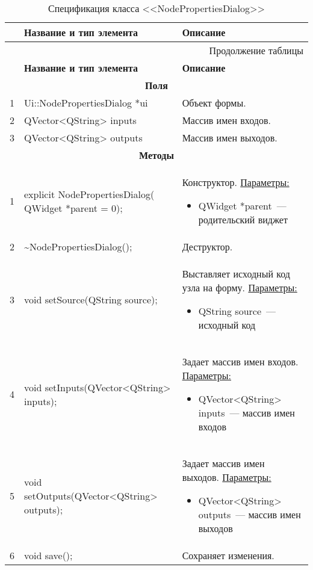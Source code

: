 \small
\singlespacing
\begin{longtable}[h]{|p{}|p{}|p{}|}
  \caption{Спецификация класса <<NodePropertiesDialog>>}
	\\ \hline
	  \textbf{\No}                  &
	  \textbf{Название и тип элемента}  &
	  \textbf{Описание}
	\\ \hline
  \endfirsthead

  \multicolumn{3}{r}{Продолжение таблицы \thetable{}}
  \\ \hline
	  \textbf{\No}                  &
	  \textbf{Название и тип элемента}  &
	  \textbf{Описание}
	\\ \hline
  \endhead

  \multicolumn{3}{|c|}{\textbf{Поля}} \\
  \hline
  1 & Ui::NodePropertiesDialog *ui & Объект формы. \\ \hline
  2 & QVector<QString> inputs & Массив имен входов. \\ \hline
  3 & QVector<QString> outputs & Массив имен выходов. \\ \hline

  \multicolumn{3}{|c|}{\textbf{Методы}} \\
  \hline
  1 & explicit NodePropertiesDialog( QWidget *parent = 0); &
    Конструктор.\newline
    \uline{Параметры:}
    \begin{itemize}[nolistsep,label=,leftmargin=0cm]
      \item QWidget *parent~--- родительский виджет
    \end{itemize}\\ \hline
  2 & \textasciitilde NodePropertiesDialog(); & Деструктор. \\ \hline
  3 & void setSource(QString source); & Выставляет исходный код узла на форму.\newline
    \uline{Параметры:}
    \begin{itemize}[nolistsep,label=,leftmargin=0cm]
      \item QString source~--- исходный код
    \end{itemize}\\ \hline
  4 & void setInputs(QVector<QString> inputs); & Задает массив имен входов.\newline
    \uline{Параметры:}
    \begin{itemize}[nolistsep,label=,leftmargin=0cm]
      \item QVector<QString> inputs~--- массив имен входов
    \end{itemize}\\ \hline
  5 & void setOutputs(QVector<QString> outputs); & Задает массив имен выходов.\newline
    \uline{Параметры:}
    \begin{itemize}[nolistsep,label=,leftmargin=0cm]
      \item QVector<QString> outputs~--- массив имен выходов
    \end{itemize}\\ \hline
  6 & void save(); & Сохраняет изменения.\\ \hline
\end{longtable}
\normalsize
\onehalfspacing


